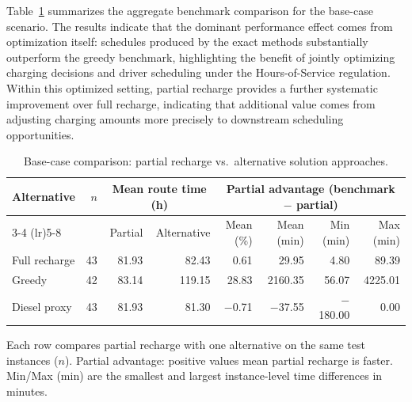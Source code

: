 \documentclass[3p,11pt,authoryear]{elsarticle}  %
\begin{document}
Table~\ref{tab:base_case_overview} summarizes the aggregate benchmark comparison for the base-case scenario. The results indicate that the dominant performance effect comes from optimization itself: schedules produced by the exact methods substantially outperform the greedy benchmark, highlighting the benefit of jointly optimizing charging decisions and driver scheduling under the Hours-of-Service regulation. Within this optimized setting, partial recharge provides a further systematic improvement over full recharge, indicating that additional value comes from adjusting charging amounts more precisely to downstream scheduling opportunities.
\begin{table}[!htbp]
\centering
\caption{Base-case comparison: partial recharge vs.\ alternative solution approaches.}
\label{tab:base_case_overview}
\begin{threeparttable}
\begin{tabular}{l r r r r r r r}
\toprule
Alternative &
$n$ &
\multicolumn{2}{c}{Mean route time (h)} &
\multicolumn{4}{c}{Partial advantage (benchmark $-$ partial)} \\
\cmidrule(lr){3-4} \cmidrule(lr){5-8}
& &
Partial & Alternative &
Mean (\%) & Mean (min) & Min (min) & Max (min) \\
\midrule
Full recharge & 43 & 81.93 & 82.43  &  0.61 &  29.95 &   4.80 &  89.39 \\
Greedy        & 42 & 83.14 & 119.15 & 28.83 & 2160.35 &  56.07 & 4225.01 \\
Diesel proxy  & 43 & 81.93 &  81.30 & $-$0.71 & $-$37.55 & $-$180.00 & 0.00 \\
\bottomrule
\end{tabular}
\begin{tablenotes}[flushleft]
\footnotesize
\item Each row compares partial recharge with one alternative on the same test instances ($n$). Partial advantage: positive values mean partial recharge is faster. Min/Max (min) are the smallest and largest instance-level time differences in minutes.
\end{tablenotes}
\end{threeparttable}
\end{table}
\end{document}
